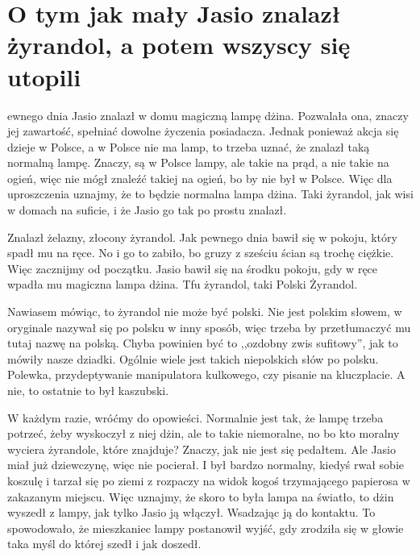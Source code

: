 \chapter{O tym jak mały Jasio znalazł żyrandol, a potem wszyscy się utopili}



ewnego dnia Jasio znalazł w domu magiczną lampę dżina.
Pozwalała ona, znaczy jej zawartość, spełniać dowolne życzenia posiadacza.
Jednak ponieważ akcja się dzieje w Polsce, a w Polsce nie ma lamp, to trzeba uznać, że znalazł taką normalną lampę.
Znaczy, są w Polsce lampy, ale takie na prąd, a nie takie na ogień, więc nie mógł znaleźć takiej na ogień, bo by nie był w Polsce.
Więc dla uproszczenia uznajmy, że to będzie normalna lampa dżina. Taki żyrandol, jak wisi w domach na suficie, i że Jasio go tak po prostu znalazł. 

Znalazł żelazny, złocony żyrandol. Jak pewnego dnia bawił się w pokoju, który spadł mu na ręce.
No i go to zabiło, bo gruzy z sześciu ścian są trochę ciężkie. Więc zacznijmy od początku.
Jasio bawił się na środku pokoju, gdy w ręce wpadła mu magiczna lampa dżina. Tfu żyrandol, taki Polski Żyrandol.

Nawiasem mówiąc, to żyrandol nie może być polski.
Nie jest polskim słowem, w oryginale nazywał się po polsku w inny sposób, więc trzeba by przetłumaczyć mu tutaj nazwę na polską.
Chyba powinien być to ,,ozdobny zwis sufitowy'', jak to mówiły nasze dziadki.
Ogólnie wiele jest takich niepolskich słów po polsku. Polewka, przydeptywanie manipulatora kulkowego, czy pisanie na kluczplacie.
A nie, to ostatnie to był kaszubski.

W każdym razie, wróćmy do opowieści.
Normalnie jest tak, że lampę trzeba potrzeć, żeby wyskoczył z niej dżin, ale to takie niemoralne, no bo kto moralny wyciera żyrandole, które znajduje?
Znaczy, jak nie jest się pedałtem. Ale Jasio miał już dziewczynę, więc nie pocierał.
I był bardzo normalny, kiedyś rwał sobie koszulę i tarzał się po ziemi z rozpaczy na widok kogoś trzymającego papierosa w zakazanym miejscu.
Więc uznajmy, że skoro to była lampa na światło, to dżin wyszedł z lampy, jak tylko Jasio ją włączył. Wsadzając ją do kontaktu.
To spowodowało, że mieszkaniec lampy postanowił wyjść, gdy zrodziła się w głowie taka myśl do której szedł i jak doszedł.

